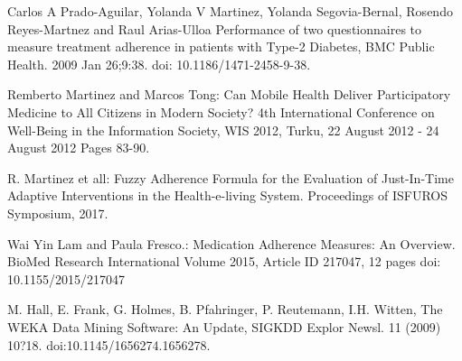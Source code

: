 \documentclass{llncs}
\begin{document}
\begin{thebibliography}{99}
 Carlos A Prado-Aguilar, Yolanda V Martinez, Yolanda Segovia-Bernal, Rosendo Reyes-Martnez and Raul Arias-Ulloa Performance of two questionnaires to measure treatment adherence in patients with Type-2 Diabetes, BMC Public Health. 2009 Jan 26;9:38. doi: 10.1186/1471-2458-9-38.

 Remberto Martinez and Marcos Tong: Can Mobile Health Deliver Participatory Medicine to  All Citizens in Modern Society? 4th International Conference on Well-Being in the Information Society, WIS 2012, Turku, 22 August 2012 - 24 August 2012 Pages 83-90.

  R. Martinez et all: Fuzzy Adherence Formula for the Evaluation of Just-In-Time Adaptive Interventions in the Health-e-living System. Proceedings of ISFUROS Symposium,  2017.

 Wai Yin Lam and Paula Fresco.: Medication Adherence Measures: An Overview. BioMed Research International Volume 2015, Article ID 217047, 12 pages doi: 10.1155/2015/217047

 M. Hall, E. Frank, G. Holmes, B. Pfahringer, P. Reutemann, I.H. Witten, The WEKA Data Mining Software:  An Update, SIGKDD Explor Newsl. 11 (2009) 10?18. doi:10.1145/1656274.1656278.

\end{thebibliography}
\end{document}
